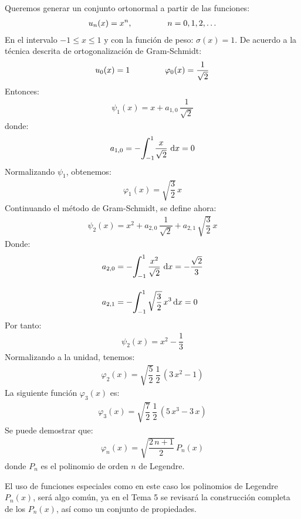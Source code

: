 \documentclass[12pt]{article}
\def\scaleint#1{\vcenter{\hbox{\scaleto[3ex]{\displaystyle\int}{#1}}}}
\def\bs{\mkern-12mu}
\numberwithin{equation}{section}
\begin{document}
Queremos generar un conjunto ortonormal a partir de las funciones:
\begin{align*}
u_{n} (x) = x^{n}, \hspace{1.5cm} n = 0, 1, 2, \ldots
\end{align*}
En el intervalo $-1 \leq x \leq 1$ y con la función de peso: $\sigma (x) = 1$. De acuerdo a la técnica descrita de ortogonalización de Gram-Schmidt:
\begin{align}
u_{0} (x) = 1 \hspace{1.5cm} \varphi_{0} (x) =  \dfrac{1}{\sqrt{2}}
\label{eq:ecuacion_10_50}
\end{align}
Entonces:
\begin{align}
\psi_{1} (x) = x + a_{1,0} \, \dfrac{1}{\sqrt{2}}
\label{eq:ecuacion_10_51}
\end{align}
donde:
\begin{align}
a_{1, 0} = - \scaleint{6ex}_{\bs -1}^{1} \dfrac{x}{\sqrt{2}} \, \dd{x} = 0
\label{eq:ecuacion_10_52}
\end{align}
Normalizando $\psi_{1}$, obtenemos:
\begin{align}
\varphi_{1} (x) = \sqrt{\dfrac{3}{2}} \, x
\label{eq:ecuacion_10_53}
\end{align}
Continuando el método de Gram-Schmidt, se define ahora:
\begin{align}
\psi_{2} (x) = x^{2} +  a_{2, 0} \, \dfrac{1}{\sqrt{2}} +  a_{2, 1} \, \sqrt{\dfrac{3}{2}} \, x
\label{eq:ecuacion_10_54}
\end{align}
Donde:
\begin{align}
a_{2, 0} &=  - \scaleint{6ex}_{\bs -1}^{1} \, \dfrac{x^{2}}{\sqrt{2}} \, \dd{x} =  - \dfrac{\sqrt{2}}{3} \label{eq:ecuacion_10_55} \\[1em] 
a_{2, 1} &=  - \scaleint{6ex}_{\bs -1}^{1} \, \sqrt{\dfrac{3}{2}} \, x^{3} \dd{x} =  0 \label{eq:ecuacion_10_56}
\end{align}
Por tanto:
\begin{align}
\psi_{2} (x) = x^{2} - \dfrac{1}{3}
\label{eq:ecuacion_10_57}
\end{align}
Normalizando a la unidad, tenemos:
\begin{align}
\varphi_{2} (x) = \sqrt{\dfrac{5}{2}} \, \dfrac{1}{2} \, (3 \, x^{2} - 1)
\label{eq:ecuacion_10_58}
\end{align}
La siguiente función $\varphi_{3}(x)$ es:
\begin{align}
\varphi_{3} (x) = \sqrt{\dfrac{7}{2}} \, \dfrac{1}{2} \, (5 \, x^{3} - 3 \, x)
\label{eq:ecuacion_10_59}
\end{align}
Se puede demostrar que:
\begin{align}
\varphi_{n} (x) = \sqrt{\dfrac{2 \, n + 1}{2}} \, P_{n} (x)
\label{eq:ecuacion_10_60}
\end{align}
donde $P_{n}$ es el polinomio de orden $n$ de Legendre.
\par
El uso de funciones especiales como en este caso los polinomios de Legendre $P_{n}(x)$, será algo común, ya en el Tema 5 se revisará la construcción completa de los $P_{n}(x)$, así como un conjunto de propiedades.
\end{document}
